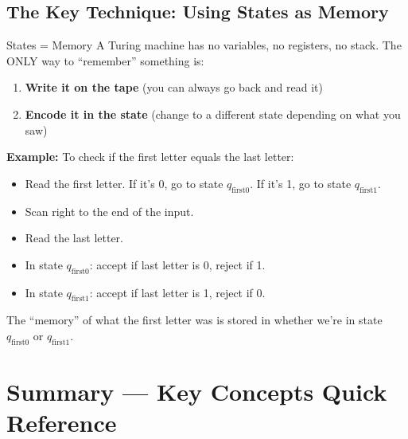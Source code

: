 \documentclass[11pt,a4paper]{article}
\begin{document}
\subsection{The Key Technique: Using States as Memory}

\begin{conceptbox}{States = Memory}
A Turing machine has no variables, no registers, no stack. The ONLY way to ``remember'' something is:
\begin{enumerate}[nosep]
\item \textbf{Write it on the tape} (you can always go back and read it)
\item \textbf{Encode it in the state} (change to a different state depending on what you saw)
\end{enumerate}

\textbf{Example:} To check if the first letter equals the last letter:
\begin{itemize}[nosep]
\item Read the first letter. If it's 0, go to state $q_{\text{first0}}$. If it's 1, go to state $q_{\text{first1}}$.
\item Scan right to the end of the input.
\item Read the last letter.
\item In state $q_{\text{first0}}$: accept if last letter is 0, reject if 1.
\item In state $q_{\text{first1}}$: accept if last letter is 1, reject if 0.
\end{itemize}

The ``memory'' of what the first letter was is stored in whether we're in state $q_{\text{first0}}$ or $q_{\text{first1}}$.
\end{conceptbox}


\newpage
\section{Summary --- Key Concepts Quick Reference}
\end{document}
